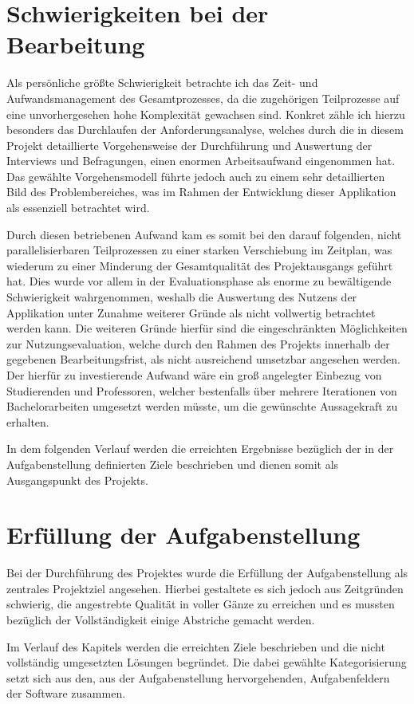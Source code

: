 \documentclass[bibliography=totoc,listof=totoc,BCOR=5mm,DIV=12,oneside]{scrbook}
\begin{document}
\newpage
\section{Schwierigkeiten bei der Bearbeitung}
\par Als persönliche größte Schwierigkeit betrachte ich das Zeit- und Aufwandsmanagement des Gesamtprozesses, da die zugehörigen Teilprozesse auf eine unvorhergesehen hohe Komplexität gewachsen sind. Konkret zähle ich hierzu besonders das Durchlaufen der Anforderungsanalyse, welches durch die in diesem Projekt detaillierte Vorgehensweise der Durchführung und Auswertung der Interviews und Befragungen, einen enormen Arbeitsaufwand eingenommen hat. Das gewählte Vorgehensmodell führte jedoch auch zu einem sehr detaillierten Bild des Problembereiches, was im Rahmen der Entwicklung dieser Applikation als essenziell betrachtet wird. 

\par \bigskip Durch diesen betriebenen Aufwand kam es somit bei den darauf folgenden, nicht parallelisierbaren Teilprozessen zu einer starken Verschiebung im Zeitplan, was wiederum zu einer Minderung der Gesamtqualität des Projektausgangs geführt hat. Dies wurde vor allem in der Evaluationsphase als enorme zu bewältigende Schwierigkeit wahrgenommen, weshalb die Auswertung des Nutzens der Applikation unter Zunahme weiterer Gründe als nicht vollwertig betrachtet werden kann. Die weiteren Gründe hierfür sind die eingeschränkten Möglichkeiten zur Nutzungsevaluation, welche durch den Rahmen des Projekts innerhalb der gegebenen Bearbeitungsfrist, als nicht ausreichend umsetzbar angesehen werden. Der hierfür zu investierende Aufwand wäre ein groß angelegter Einbezug von Studierenden und Professoren, welcher bestenfalls über mehrere Iterationen von Bachelorarbeiten umgesetzt werden müsste, um die gewünschte Aussagekraft zu erhalten.

\par \bigskip In dem folgenden Verlauf werden die erreichten Ergebnisse bezüglich der in der Aufgabenstellung definierten Ziele beschrieben und dienen somit als Ausgangspunkt des Projekts.

\section{Erfüllung der Aufgabenstellung}
\par Bei der Durchführung des Projektes wurde die Erfüllung der Aufgabenstellung als zentrales Projektziel angesehen. Hierbei gestaltete es sich jedoch aus Zeitgründen schwierig, die angestrebte Qualität in voller Gänze zu erreichen und es mussten bezüglich der Vollständigkeit einige Abstriche gemacht werden.
\par \bigskip Im Verlauf des Kapitels werden die erreichten Ziele beschrieben und die nicht vollständig umgesetzten Lösungen begründet. Die dabei gewählte Kategorisierung setzt sich aus den, aus der Aufgabenstellung hervorgehenden, Aufgabenfeldern der Software zusammen.
\end{document}
